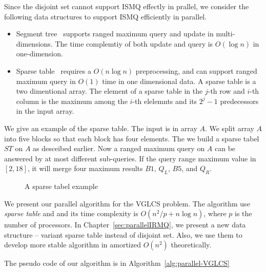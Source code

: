 Since the disjoint set cannot support ISMQ effectly in prallel, we
consider the following data structures to support ISMQ efficiently in
parallel.

\begin{itemize}
  \item Segment tree~\cite{berg2000computational} supports ranged
    maximum query and update in multi-dimensions.  The time complemtiy
    of both update and query is $O(\log n)$ in one-dimension.
  \item Sparse table~\cite{Berkman1993RecursiveSP} requires a $O(n
    \log n)$ preprocessing, and can support ranged maximum query in
    $O(1)$ time in one dimensional data.  A sparse table is a two
    dimentional array.  The element of a sparse table in the $j$-th
    row and $i$-th column is the maximum among the $i$-th elelemnts
    and its $2^j - 1$ predecessors in the input array.
\end{itemize}

We give an example of the sparse table.  The input is in array $A$.
We split array $A$ into five blocks so that each block has four
elements.  The we build a sparse tabel $ST$ on $A$ as desceibed
earlier.  Now a ranged maximum query on $A$ can be answered by at most
 different sub-queries.  If the query range maximum value in $[2,
  18]$, it will merge four maximum results $B1$, $Q_L$, $B5$, and
$Q_R$.
    
\begin{figure*}[!thb]
  \centering {} 
  \caption{A sparse tabel example}
  \label{fig:interval-decomposition}
\end{figure*}

We present our parallel algorithm for the VGLCS problem.  The
algorithm use {\em sparse table} and and its time complexity is $O(n^2
/ p + n \log n)$, where $p$ is the number of processors.  In
Chapter~\ref{sec:parallelIRMQ}, we present a new data structure --
variant sparse table instead of disjoint set.  Also, we use them to
develop more stable algorithm in amortized $O(n^2)$ theoretically.



The pseudo code of our algorithm is in Algorithm~\ref{alg:parallel-VGLCS}

\iffalse 稀疏表是我們認為最好的替代方案，其整合後為 VGLCS 平行算法
\ref{alg:parallel-VGLCS}，算法的時間複雜度為 $O(n^2 / p + n \log n)$，
其中 $p$ 為處理器個數。在後續的章節，我們將提出新的數據結構取代并查集操
作，且能在平行算法達到理想複雜度 $O(n^2 / p + n \log n)$。\fi


